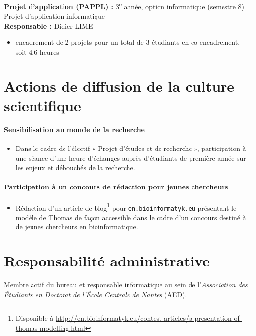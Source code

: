 \bigskip\noindent
\textbf{Projet d'application (PAPPL) :} 3\textsuperscript{e} année, option informatique (semestre 8)\\
Projet d'application informatique\\
\textbf{Responsable :} Didier LIME
\begin{itemize}
  \item encadrement de 2 projets pour un total de 3 étudiants en co-encadrement, soit 4,6 heures
\end{itemize}



\section{Actions de diffusion de la culture scientifique}

\paragraph{Sensibilisation au monde de la recherche}
\begin{itemize}
\item[]
Dans le cadre de l'électif « Projet d'études et de recherche »,
participation à une séance d'une heure d'échanges auprès d'étudiants de première année sur les enjeux et débouchés de la recherche.
\end{itemize}

\paragraph{Participation à un concours de rédaction pour jeunes chercheurs}
\begin{itemize}
\item[] Rédaction d'un article de blog\footnote{Disponible à \scriptsize\url{http://en.bioinformatyk.eu/contest-articles/a-presentation-of-thomas-modelling.html}} pour \texttt{en.bioinformatyk.eu} présentant le modèle de Thomas de façon accessible dans le cadre d'un concours destiné à de jeunes chercheurs en bioinformatique.
\end{itemize}



\section{Responsabilité administrative}
Membre actif du bureau et responsable informatique au sein de l'\emph{Association des Étudiants en Doctorat de l'École Centrale de Nantes} (AED).
